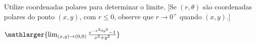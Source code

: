 Utilize coordenadas polares para determinar o limite. [Se $(r,\theta)$ são coordenadas polares do ponto $(x,y)$, com $r\leq 0$, observe que $r \rightarrow 0^+$ quando $(x,y)
$.]


$\mathlarger{\lim_{(x,y)\rightarrow(0,0)}  \frac{e^{-x^20y^2}-1}{x^2+y^2}}$
